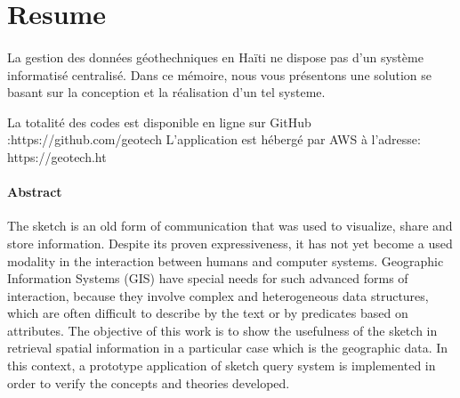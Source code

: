 \section{Resume}
\paragraph{}
La gestion des données géothechniques en Haïti ne dispose pas d’un système informatisé centralisé. Dans ce mémoire, nous vous présentons une solution se basant sur la conception et la réalisation d'un tel systeme.\par 

La totalité des codes est disponible en ligne sur GitHub :https://github.com/geotech
L’application est hébergé par AWS à l’adresse: https://geotech.ht

\paragraph{Abstract}
\par 
The sketch is an old form of communication that was used to visualize, share and store information. Despite its proven
expressiveness, it has not yet become a used modality in the interaction between humans and computer systems. Geographic
Information Systems (GIS) have special needs for such advanced forms of interaction, because they involve complex and
heterogeneous data structures, which are often difficult to describe by the text or by predicates based on attributes. The objective of
this work is to show the usefulness of the sketch in retrieval spatial information in a particular case which is the geographic data. In
this context, a prototype application of sketch query system is implemented in order to verify the concepts and theories developed.